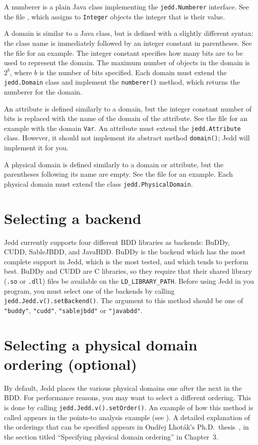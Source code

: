 \documentclass{article}
\begin{document}
A numberer is a plain Java class implementing the {\tt jedd.Numberer}
interface. See the file ,
which assigns to {\tt Integer} objects the integer that is their value.

A domain is similar to a Java class, but is defined with a
slightly different syntax: the class name is immediately followed
by an integer constant in parentheses. See the file 
 for an example.
The integer constant specifies how many bits are to be used to represent
the domain. The maximum number of objects in the domain is $2^b$, where $b$
is the number of bits specified. Each domain must extend the {\tt jedd.Domain}
class and implement the {\tt numberer()} method, which returns the
numberer for the domain.

An attribute is defined similarly to a domain, but the integer constant
number of bits is replaced with the name of the domain of the attribute.
See the file  for an
example with the domain {\tt Var}. An attribute must extend the 
{\tt jedd.Attribute} class. However, it should not implement its
abstract method {\tt domain()}; Jedd will implement it for you.

A physical domain is defined similarly to a domain or attribute, but
the parentheses following its name are empty. See the file 
 for an example.
Each physical domain must extend the class {\tt jedd.PhysicalDomain}.

\section{Selecting a backend}
Jedd currently supports four different BDD libraries as backends:
BuDDy, CUDD, SableJBDD, and JavaBDD. BuDDy is the backend which has
the most complete support in Jedd, which is the most tested, and which
tends to perform best. BuDDy and CUDD are C libraries, so they require
that their shared library ({\tt .so} or {\tt .dll}) files be available
on the {\tt LD\_LIBRARY\_PATH}. Before using Jedd in you program,
you must select one of the backends by calling
{\tt jedd.Jedd.v().setBackend()}. The argument to this method
should be one of {\tt "buddy"}, {\tt "cudd"}, {\tt "sablejbdd"} or
{\tt "javabdd"}.

\section{Selecting a physical domain ordering (optional)}
By default, Jedd places the various physical domains one after the next
in the BDD. For performance reasons, you may want to select a different
ordering. This is done by calling {\tt jedd.Jedd.v().setOrder()}.
An example of how this method is called appears in the points-to
analysis example 
(see ). A detailed
explanation of the orderings that can be specified appears in Ond\v{r}ej
Lhot\'ak's Ph.D.\ thesis~\cite{Lhotak:2005:PAU}, in the section
titled ``Specifying physical domain ordering'' in Chapter~3.
\end{document}

